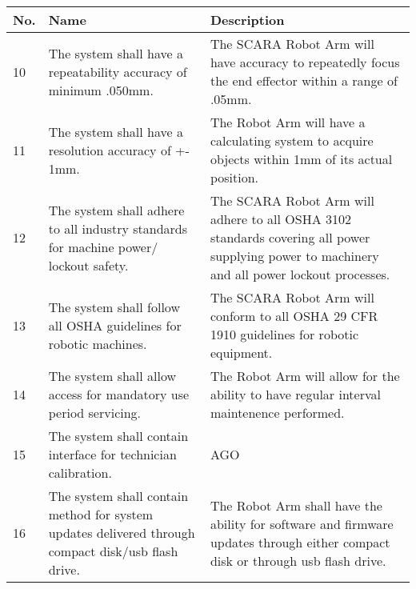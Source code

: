\begin{tabular}{ |p{1cm}|p{5cm}|p{7cm}|  }

\hline
No.& Name &Description \\
\hline

10 & The system shall have a repeatability accuracy of minimum .050mm. & The SCARA Robot Arm will have accuracy to repeatedly focus the end effector within a range of .05mm. \\
11 & The system shall have a resolution accuracy of +- 1mm. & The Robot Arm will have a calculating system to acquire objects within 1mm of its actual position. \\
12 & The system shall adhere to all industry standards for machine power/ lockout safety.  & The SCARA Robot Arm will adhere to all OSHA 3102 standards covering all power supplying power to machinery and all power lockout processes. \\
13 & The system shall follow all OSHA guidelines for robotic machines.  & The SCARA Robot Arm will conform to all OSHA 29 CFR 1910 guidelines for robotic equipment. \\
14 & The system shall allow access for mandatory use period servicing.  & The Robot Arm will allow for the ability to have regular interval maintenence performed.  \\
15 & The system shall contain interface for technician calibration.  & AGO \\
16 & The system shall contain method for system updates delivered through compact disk/usb flash drive. & The Robot Arm shall have the ability for software and firmware updates through either compact disk or through usb flash drive.  \\
\hline

\end{tabular}
